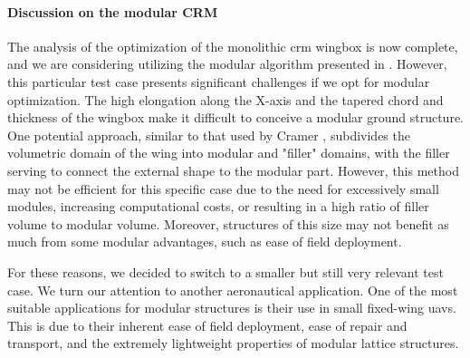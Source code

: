 \paragraph{Discussion on the modular CRM}
The analysis of the optimization of the monolithic \gls{crm} wingbox is now complete, and we are considering utilizing the modular algorithm presented in . However, this particular test case presents significant challenges if we opt for modular optimization. The high elongation along the X-axis and the tapered chord and thickness of the wingbox make it difficult to conceive a modular ground structure. One potential approach, similar to that used by Cramer \etal {}, subdivides the volumetric domain of the wing into modular and "filler" domains, with the filler serving to connect the external shape to the modular part. However, this method may not be efficient for this specific case due to the need for excessively small modules, increasing computational costs, or resulting in a high ratio of filler volume to modular volume. Moreover, structures of this size may not benefit as much from some modular advantages, such as ease of field deployment.

For these reasons, we decided to switch to a smaller but still very relevant test case. We turn our attention to another aeronautical application. One of the most suitable applications for modular structures is their use in small fixed-wing \glspl{uav}. This is due to their inherent ease of field deployment, ease of repair and transport, and the extremely lightweight properties of modular lattice structures.

